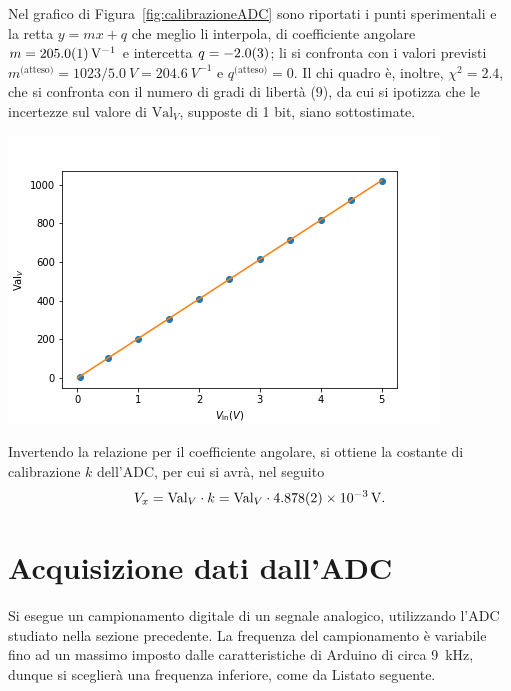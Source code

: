\documentclass[10pt,oneside,a4paper]{article}
\newenvironment{Figure}
  {\par\medskip\noindent\minipage{\linewidth}}
  {\endminipage\par\medskip}
\begin{document}
\begin{multicols}{2}
Nel grafico di Figura~\ref{fig:calibrazioneADC} sono riportati i punti sperimentali e la retta $y = mx+q$ che meglio li interpola, di coefficiente angolare $m = \SI{205.0 \pm 0.1}{V^{-1}}$ e intercetta $q = \SI{-2.0 \pm 0.3}{}$; li si confronta con i valori previsti $m^{\text{(atteso)}} = 1023/\SI{5.0}{V} = \SI{204.6}{V^{-1}}$ e $q^{\text{(atteso)}} = 0$. Il chi quadro è, inoltre, $\chi^2 = 2.4$, che si confronta con il numero di gradi di libertà ($9$), da cui si ipotizza che le incertezze sul valore di $\text{Val}_V$, supposte di 1 bit, siano sottostimate.

\begin{Figure}
	\begin{center}
	\includegraphics[width=\linewidth]{calibrazioneADC.png}
	\label{fig:calibrazioneADC}
	\end{center}
\end{Figure}

Invertendo la relazione per il coefficiente angolare, si ottiene la costante di calibrazione $k$ dell'ADC, per cui si avrà, nel seguito
\[
V_x = \text{Val}_V \cdot k = \text{Val}_V \cdot \SI{4.878 \pm 0.002 e-3}{V}.
\]

\section{Acquisizione dati dall'ADC}
Si esegue un campionamento digitale di un segnale analogico, utilizzando l'ADC studiato nella sezione precedente. La frequenza del campionamento è variabile fino ad un massimo imposto dalle caratteristiche di Arduino di circa \SI{9}{\kilo \Hz}, dunque si sceglierà una frequenza inferiore, come da Listato seguente.


\end{multicols}
\end{document}
